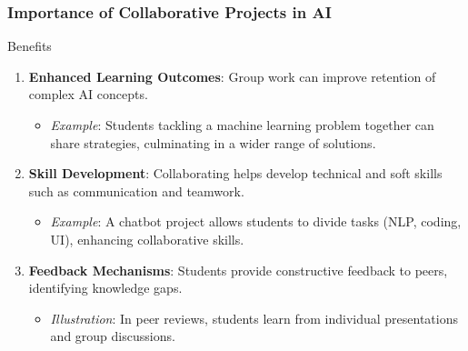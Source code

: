 \documentclass[aspectratio=169]{beamer}
\begin{document}
\begin{frame}[fragile]
    \frametitle{Importance of Collaborative Projects in AI}
    \begin{block}{Benefits}
        \begin{enumerate}
            \item \textbf{Enhanced Learning Outcomes}: Group work can improve retention of complex AI concepts. 
            \begin{itemize}
                \item \textit{Example}: Students tackling a machine learning problem together can share strategies, culminating in a wider range of solutions.
            \end{itemize}
            \item \textbf{Skill Development}: Collaborating helps develop technical and soft skills such as communication and teamwork. 
            \begin{itemize}
                \item \textit{Example}: A chatbot project allows students to divide tasks (NLP, coding, UI), enhancing collaborative skills.
            \end{itemize}
            \item \textbf{Feedback Mechanisms}: Students provide constructive feedback to peers, identifying knowledge gaps.
            \begin{itemize}
                \item \textit{Illustration}: In peer reviews, students learn from individual presentations and group discussions.
            \end{itemize}
        \end{enumerate}
    \end{block}
\end{frame}
\end{document}
